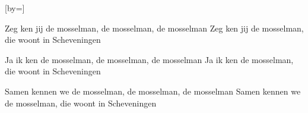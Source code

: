  

[by=]




\beginverse
    Zeg ken jij de mosselman, 
    de mosselman, \brk  de mosselman
    Zeg ken jij de mosselman, 
    die woont in Scheveningen
\endverse

\beginverse
    Ja ik ken de mosselman, 
    de mosselman, \brk  de mosselman
    Ja ik ken de mosselman, 
    die woont in Scheveningen
\endverse

\beginverse
    Samen kennen we de mosselman, 
    de mosselman, \brk  de mosselman
    Samen kennen we de mosselman, 
    die woont in Scheveningen
\endverse




\endsong
